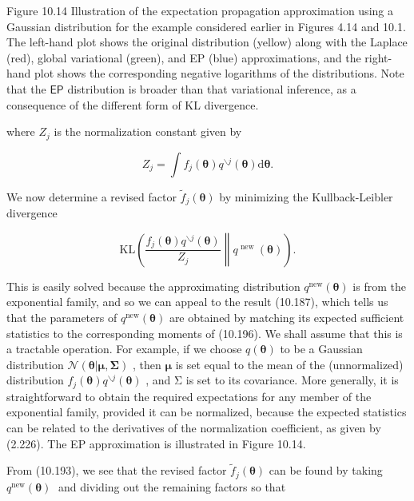 \documentclass[
  10
]{article}
\begin{document}
Figure 10.14 Illustration of the expectation propagation approximation
using a Gaussian distribution for the example considered earlier in
Figures 4.14 and 10.1. The left-hand plot shows the original
distribution (yellow) along with the Laplace (red), global variational
(green), and EP (blue) approximations, and the right-hand plot shows the
corresponding negative logarithms of the distributions. Note that the
\(\mathsf { E P }\) distribution is broader than that variational
inference, as a consequence of the different form of KL divergence.

where \(Z _ { j }\) is the normalization constant given by

\[
Z _ {j} = \int f _ {j} (\boldsymbol {\theta}) q ^ {\backslash j} (\boldsymbol {\theta}) \mathrm{d} \boldsymbol {\theta}.\tag{10.197}
\]

We now determine a revised factor
\(\widetilde { f } _ { j } ( \pmb { \theta } )\) by minimizing the
Kullback-Leibler divergence

\[
\mathrm{KL} \left( \right.\frac {f _ {j} (\boldsymbol {\theta}) q ^ {\backslash j} (\boldsymbol {\theta})}{Z _ {j}} \left. \right\| q ^ {\text { new }} (\boldsymbol {\theta})\left. \right).\tag{10.198}
\]

This is easily solved because the approximating distribution
\(q ^ { \mathrm { n e w } } ( \pmb { \theta } )\) is from the
exponential family, and so we can appeal to the result (10.187), which
tells us that the parameters of
\(q ^ { \mathrm { n e w } } ( \pmb { \theta } )\) are obtained by
matching its expected sufficient statistics to the corresponding moments
of (10.196). We shall assume that this is a tractable operation. For
example, if we choose \(q ( \pmb \theta )\) to be a Gaussian
distribution
\(\mathcal { N } ( \pmb { \theta } | \pmb { \mu } , \pmb { \Sigma } )\)
, then \(\pmb { \mu }\) is set equal to the mean of the (unnormalized)
distribution
\(f _ { j } ( \pmb { \theta } ) q ^ { \backslash j } ( \pmb { \theta } )\)
, and Σ is set to its covariance. More generally, it is straightforward
to obtain the required expectations for any member of the exponential
family, provided it can be normalized, because the expected statistics
can be related to the derivatives of the normalization coefficient, as
given by (2.226). The EP approximation is illustrated in Figure 10.14.

From (10.193), we see that the revised factor
\(\widetilde { f } _ { j } ( \pmb { \theta } )\) can be found by taking
\(q ^ { \mathrm { n e w } } ( \pmb { \theta } )\) and dividing out the
remaining factors so that
\end{document}
